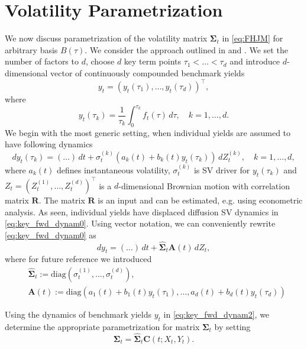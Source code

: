 \documentclass[pdftex,11pt,a4paper] {article}
\begin{document}
\section{Volatility Parametrization}\label{sec:vol_parametrization}
We now discuss parametrization of the volatility matrix $\mathbf{\Sigma}_t$ in \eqref{eq:FHJM} for arbitrary basis $B(\tau)$. We consider the approach outlined in \cite{Lyashenko2023} and \cite{AndersenPiterbarg2010}. We set the number of factors to $d$, choose $d$ key term points $\tau_1<\ldots<\tau_d$ and introduce $d$-dimensional vector of continuously compounded benchmark yields
\begin{equation*}
y_t=\left(y_t(\tau_1),\ldots, y_t(\tau_d)\right)^\top,
\end{equation*}
where 
\begin{equation*}
y_t(\tau_k)=\frac{1}{\tau_k}\int_0^{\tau_k} f_t(\tau)\,d\tau, \quad k=1,\ldots, d.
\end{equation*}
We begin with the most generic setting, when individual yields are assumed to have following dynamics
\begin{equation}\label{eq:key_fwd_dynam0}
dy_t(\tau_k)=(\ldots)\,dt + \sigma_t^{(k)}\left(a_k(t)+b_k(t)y_t(\tau_k)\right)\,dZ^{(k)}_t,\quad k=1,\ldots, d,
\end{equation}
where $a_k(t)$ defines instantaneous volatility, $\sigma_t^{(k)}$ is SV driver for $y_t(\tau_k)$ and $Z_t=\left(Z^{(1)}_t,\ldots, Z^{(d)}_t\right)^\top$ is a $d$-dimensional Brownian motion with correlation matrix $\mathbf{R}$.  The matrix $\mathbf{R}$ is an input and can be estimated, e.g. using econometric analysis. As seen, individual yields have displaced diffusion SV dynamics in \eqref{eq:key_fwd_dynam0}. Using vector notation, we can conveniently rewrite \eqref{eq:key_fwd_dynam0} as
\begin{equation}\label{eq:key_fwd_dynam2}
dy_t=(\ldots)\,dt + \hat{\mathbf{\Sigma}}_t \mathbf{A}(t)\,dZ_t,
\end{equation}
where for future reference we introduced
\begin{equation*}
\begin{split}
&\hat{\mathbf{\Sigma}}_t:=\mathrm{diag}\left(\sigma_t^{(1)},\ldots,\sigma_t^{(d)}\right),\\
&\mathbf{A}(t):=\mathrm{diag}\left(a_1(t)+b_1(t)y_t(\tau_1),\ldots,a_d(t)+b_d(t)y_t(\tau_d)\right)
\end{split}
\end{equation*}


Using the dynamics of benchmark yields $y_t$ in \eqref{eq:key_fwd_dynam2}, we determine the appropriate parametrization for matrix $\mathbf{\Sigma}_t$ by setting 
\begin{equation*}
\mathbf{\Sigma}_t=\hat{\mathbf{\Sigma}}_t \mathbf{C}(t;X_t,Y_t).
\end{equation*}
\end{document}

